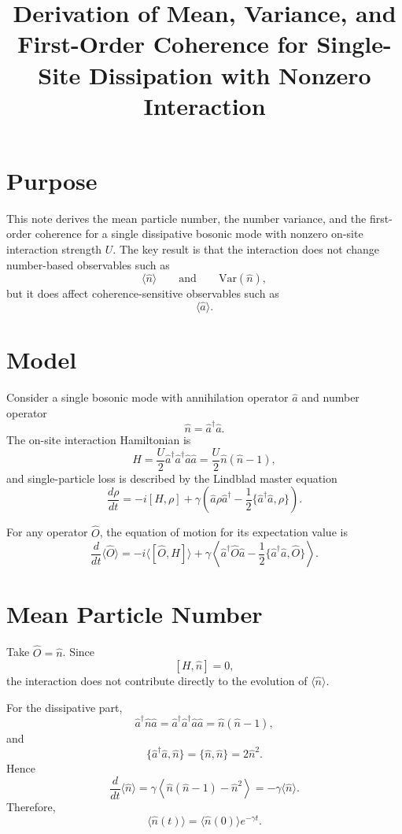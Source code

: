 \documentclass[12pt]{article}
\title{Derivation of Mean, Variance, and First-Order Coherence for Single-Site Dissipation with Nonzero Interaction}
\author{}
\date{}
\begin{document}
\maketitle

\section*{Purpose}
This note derives the mean particle number, the number variance, and the first-order coherence for a single dissipative bosonic mode with nonzero on-site interaction strength $U$. The key result is that the interaction does not change number-based observables such as
\[
\langle \hat n \rangle
\qquad \text{and} \qquad
\mathrm{Var}(\hat n),
\]
but it does affect coherence-sensitive observables such as
\[
\langle \hat a \rangle.
\]

\section*{Model}
Consider a single bosonic mode with annihilation operator $\hat a$ and number operator
\[
\hat n = \hat a^\dagger \hat a.
\]
The on-site interaction Hamiltonian is
\[
H = \frac{U}{2}\hat a^\dagger \hat a^\dagger \hat a \hat a
= \frac{U}{2}\hat n(\hat n-1),
\]
and single-particle loss is described by the Lindblad master equation
\[
\frac{d\rho}{dt}
= -i[H,\rho]
+ \gamma\left(\hat a \rho \hat a^\dagger - \frac{1}{2}\{\hat a^\dagger \hat a,\rho\}\right).
\]

For any operator $\hat O$, the equation of motion for its expectation value is
\[
\frac{d}{dt}\langle \hat O\rangle
= -i\langle[\hat O,H]\rangle
+ \gamma\left\langle
\hat a^\dagger \hat O \hat a
- \frac{1}{2}\{\hat a^\dagger \hat a,\hat O\}
\right\rangle.
\]

\section*{Mean Particle Number}
Take $\hat O=\hat n$. Since
\[
[H,\hat n]=0,
\]
the interaction does not contribute directly to the evolution of $\langle \hat n\rangle$.

For the dissipative part,
\[
\hat a^\dagger \hat n \hat a
= \hat a^\dagger \hat a^\dagger \hat a \hat a
= \hat n(\hat n-1),
\]
and
\[
\{\hat a^\dagger \hat a,\hat n\}
= \{\hat n,\hat n\}
= 2\hat n^2.
\]
Hence
\[
\frac{d}{dt}\langle \hat n\rangle
= \gamma\left\langle \hat n(\hat n-1)-\hat n^2\right\rangle
= -\gamma \langle \hat n\rangle.
\]
Therefore,
\[
\boxed{
\langle \hat n(t)\rangle
= \langle \hat n(0)\rangle e^{-\gamma t}.
}
\]
\end{document}
